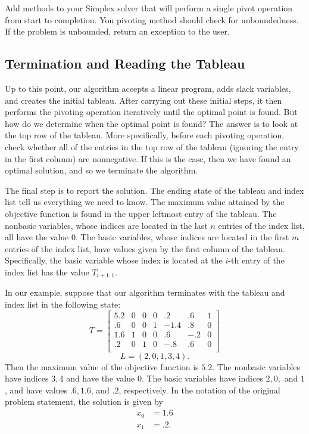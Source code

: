\begin{problem}
Add methods to your Simplex solver that will perform a single pivot operation from start to completion.
You pivoting method should check for unboundedness.
If the problem is unbounded, return an exception to the user.
\end{problem}

\subsection{Termination and Reading the Tableau}
Up to this point, our algorithm accepts a linear program, adds slack variables, and creates the initial tableau. After
carrying out these initial steps, it then performs the pivoting operation iteratively until the optimal point is found.
But how do we determine when the optimal point is found? The answer is to look at the top row of the tableau. More specifically,
before each pivoting operation, check whether all of the entries in the top row of the tableau (ignoring the entry in the first
column) are nonnegative. If this is the case, then we have found an optimal solution, and so we terminate the algorithm.

The final step is to report the solution. The ending state of the tableau and index list tell us everything we need to know.
The maximum value attained by the objective function is found in the upper leftmost entry of the tableau. The nonbasic variables,
whose indices are located in the last $n$ entries of the index list, all have the value $0$. The basic variables, whose indices
are located in the first $m$ entries of the index list, have values given by the first column of the tableau. Specifically, the basic
variable whose index is located at the $i$-th entry of the index list has the value $T_{i+1, 1}$.

In our example, suppose that our algorithm terminates with the tableau and index list in the following state:
\[
T = \begin{bmatrix}
5.2 & 0 & 0 & 0 & .2 & .6 & 1\\
.6 & 0 & 0 & 1 & -1.4 & .8 & 0\\
1.6 & 1 & 0 & 0 & .6 & -.2 & 0\\
.2 & 0 & 1 & 0 & -.8 & .6 & 0\\
\end{bmatrix}
\]
\[
L = (2, 0, 1, 3, 4).
\]
Then the maximum value of the objective function is $5.2$. The nonbasic variables have indices $3, 4$ and have the value $0$.
The basic variables have indices $2, 0,$ and $1$, and have values $.6, 1.6$, and $.2$, respectively.
In the notation of the original problem statement, the solution is given by
\begin{align*}
x_0 &= 1.6\\
x_1 &= .2.
\end{align*}

